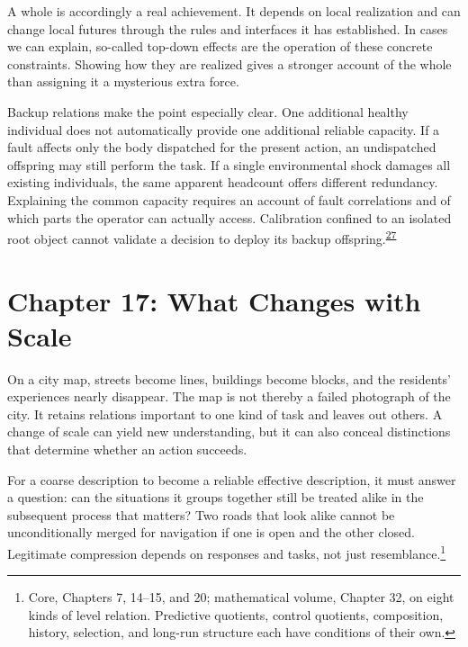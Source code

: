 \documentclass[
  english,
  11pt,
  oneside]{book}
\begin{document}
A whole is accordingly a real achievement. It depends on local realization and can change local futures through the rules and interfaces it has established. In cases we can explain, so-called top-down effects are the operation of these concrete constraints. Showing how they are realized gives a stronger account of the whole than assigning it a mysterious extra force.

\begingroup{}

Backup relations make the point especially clear. One additional healthy individual does not automatically provide one additional reliable capacity. If a fault affects only the body dispatched for the present action, an undispatched offspring may still perform the task. If a single environmental shock damages all existing individuals, the same apparent headcount offers different redundancy. Explaining the common capacity requires an account of fault correlations and of which parts the operator can actually access. Calibration confined to an isolated root object cannot validate a decision to deploy its backup offspring.\textsuperscript{\hyperlink{ph-note-27}{27}}

\par\endgroup

\chapter{Chapter 17: What Changes with Scale}\label{ph-ch-17}

On a city map, streets become lines, buildings become blocks, and the residents' experiences nearly disappear. The map is not thereby a failed photograph of the city. It retains relations important to one kind of task and leaves out others. A change of scale can yield new understanding, but it can also conceal distinctions that determine whether an action succeeds.

For a coarse description to become a reliable effective description, it must answer a question: can the situations it groups together still be treated alike in the subsequent process that matters? Two roads that look alike cannot be unconditionally merged for navigation if one is open and the other closed. Legitimate compression depends on responses and tasks, not just resemblance.\footnote{\hypertarget{ph-note-42}{}Core, Chapters 7, 14--15, and 20; mathematical volume, Chapter 32, on eight kinds of level relation. Predictive quotients, control quotients, composition, history, selection, and long-run structure each have conditions of their own.}
\end{document}

